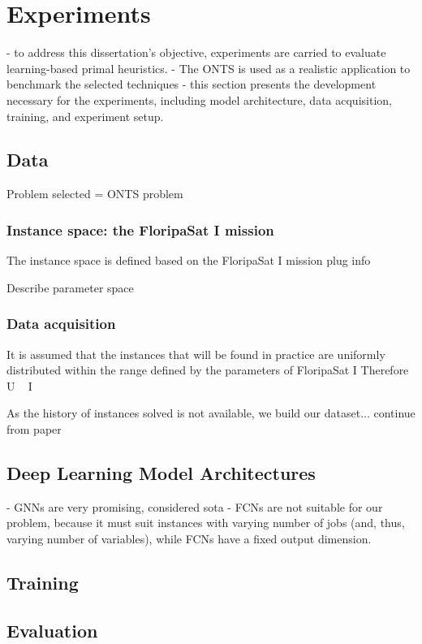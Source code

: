 

\chapter{Experiments}\label{chap:experiments}

- to address this dissertation's objective, experiments are carried to evaluate learning-based primal heuristics.
- The ONTS is used as a realistic application to benchmark the selected techniques
- this section presents the development necessary for the experiments, including model architecture, data acquisition, training, and experiment setup.

\section{Data}

Problem selected = ONTS problem

\subsection{Instance space: the FloripaSat I mission}

The instance space is defined based on the FloripaSat I mission
    plug info

Describe parameter space

\subsection{Data acquisition}

It is assumed that the instances that will be found in practice are uniformly distributed within the range defined by the parameters of FloripaSat I
Therefore U ~ I

As the history of instances solved is not available, we build our dataset...
    continue from paper

\section{Deep Learning Model Architectures}

- GNNs are very promising, considered sota
- FCNs are not suitable for our problem, because it must suit instances with varying number of jobs (and, thus, varying number of variables), while FCNs have a fixed output dimension.

\section{Training}

\section{Evaluation}

